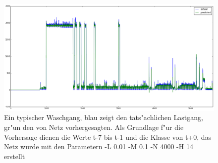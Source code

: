 \begin{figure}[ht]
\includegraphics[width=0.95\textheight , angle=90]{1_Grafiken/predicted.png}
	\caption[Typischer Waschgang, vorhergesagt]{Ein typischer Waschgang, blau zeigt den tats"achlichen Lastgang, gr"un den von Netz vorhergesagten. Als Grundlage f"ur die Vorhersage dienen die Werte t-7 bis t-1 und die Klasse von t+0, das Netz wurde mit den Parametern -L 0.01 -M 0.1 -N 4000 -H 14 erstellt}
\label{GenWasch}
\end{figure}
